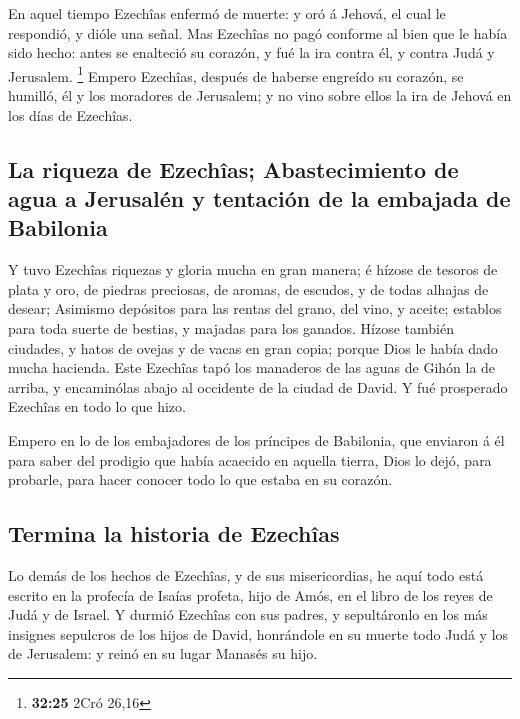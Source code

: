  En aquel tiempo Ezechîas enfermó de muerte: y oró á
Jehová, el cual le respondió, y dióle una señal.  Mas
Ezechîas no pagó conforme al bien que le había sido hecho: antes se
enalteció su corazón, y fué la ira contra él, y contra Judá y Jerusalem.
\footnote{\textbf{32:25} 2Cró 26,16}  Empero Ezechîas,
después de haberse engreído su corazón, se humilló, él y los moradores
de Jerusalem; y no vino sobre ellos la ira de Jehová en los días de
Ezechîas.

\hypertarget{la-riqueza-de-ezechuxeeas-abastecimiento-de-agua-a-jerusaluxe9n-y-tentaciuxf3n-de-la-embajada-de-babilonia}{%
\subsection{La riqueza de Ezechîas; Abastecimiento de agua a Jerusalén y
tentación de la embajada de
Babilonia}\label{la-riqueza-de-ezechuxeeas-abastecimiento-de-agua-a-jerusaluxe9n-y-tentaciuxf3n-de-la-embajada-de-babilonia}}

 Y tuvo Ezechîas riquezas y gloria mucha en gran manera; é
hízose de tesoros de plata y oro, de piedras preciosas, de aromas, de
escudos, y de todas alhajas de desear;  Asimismo depósitos
para las rentas del grano, del vino, y aceite; establos para toda suerte
de bestias, y majadas para los ganados.  Hízose también
ciudades, y hatos de ovejas y de vacas en gran copia; porque Dios le
había dado mucha hacienda.  Este Ezechîas tapó los
manaderos de las aguas de Gihón la de arriba, y encaminólas abajo al
occidente de la ciudad de David. Y fué prosperado Ezechîas en todo lo
que hizo.

 Empero en lo de los embajadores de los príncipes de
Babilonia, que enviaron á él para saber del prodigio que había acaecido
en aquella tierra, Dios lo dejó, para probarle, para hacer conocer todo
lo que estaba en su corazón.

\hypertarget{termina-la-historia-de-ezechuxeeas}{%
\subsection{Termina la historia de
Ezechîas}\label{termina-la-historia-de-ezechuxeeas}}

 Lo demás de los hechos de Ezechîas, y de sus
misericordias, he aquí todo está escrito en la profecía de Isaías
profeta, hijo de Amós, en el libro de los reyes de Judá y de Israel.
 Y durmió Ezechîas con sus padres, y sepultáronlo en los
más insignes sepulcros de los hijos de David, honrándole en su muerte
todo Judá y los de Jerusalem: y reinó en su lugar Manasés su hijo.

